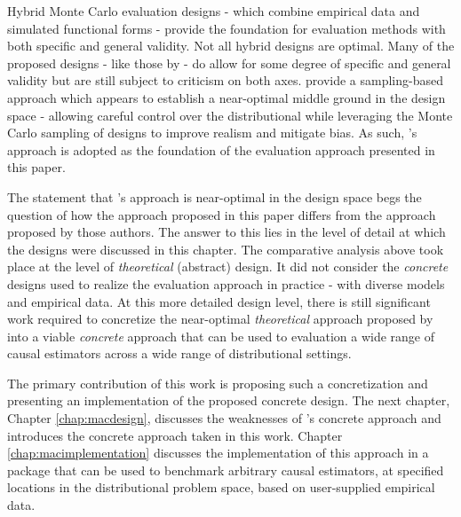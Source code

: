 \documentclass[../main.tex]{subfiles}
\begin{document}
Hybrid Monte Carlo evaluation designs - which combine empirical data and simulated functional forms - provide the foundation for evaluation methods with both specific and general validity. Not all hybrid designs are optimal. Many of the proposed designs - like those by \textcite{Huber2013TheScore, Knaus2018MachineEvidence, Hill2011BayesianInference, Wendling2018ComparingDatabases, Kern2016AssessingPopulations} - do allow for some degree of specific and general validity but are still subject to criticism on both axes. \textcite{Dorie2019Automated1} provide a sampling-based approach which appears to establish a near-optimal middle ground in the design space - allowing careful control over the distributional while leveraging the Monte Carlo sampling of designs to improve realism and mitigate bias. As such, \textcite{Dorie2019Automated1}'s approach is adopted as the foundation of the evaluation approach presented in this paper.

\vspace{\baselineskip}

The statement that \textcite{Dorie2019Automated1}'s approach is near-optimal in the design space begs the question of how the approach proposed in this paper differs from the approach proposed by those authors. The answer to this lies in the level of detail at which the designs were discussed in this chapter. The comparative analysis above took place at the level of \textit{theoretical} (abstract) design. It did not consider the \textit{concrete} designs used to realize the evaluation approach in practice - with diverse models and empirical data. At this more detailed design level, there is still significant work required to concretize the near-optimal \textit{theoretical} approach proposed by \textcite{Dorie2019Automated1} into a viable \textit{concrete} approach that can be used to evaluation a wide range of causal estimators across a wide range of distributional settings.

\vspace{\baselineskip}

The primary contribution of this work is proposing such a concretization and presenting an implementation of the proposed concrete design. The next chapter, Chapter \ref{chap:macdesign}, discusses the weaknesses of \textcite{Dorie2019Automated1}'s concrete approach and introduces the concrete approach taken in this work. Chapter \ref{chap:macimplementation} discusses the implementation of this approach in a package that can be used to benchmark arbitrary causal estimators, at specified locations in the distributional problem space, based on user-supplied empirical data.
\end{document}
